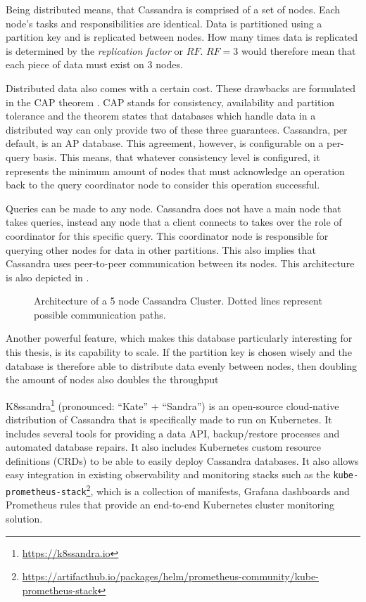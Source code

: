 Being distributed means, that Cassandra is comprised of a set of nodes. Each node's tasks and responsibilities are identical. Data is partitioned using a partition key and is replicated between nodes. How many times data is replicated is determined by the \textit{replication factor} or \(RF\). \(RF = 3\) would therefore mean that each piece of data must exist on 3 nodes.

Distributed data also comes with a certain cost. These drawbacks are formulated in the CAP theorem \cite{foxHarvestYieldScalable1999a}. CAP stands for consistency, availability and partition tolerance and the theorem states that databases which handle data in a distributed way can only provide two of these three guarantees. Cassandra, per default, is an AP database. This agreement, however, is configurable on a per-query basis. This means, that whatever consistency level is configured, it represents the minimum amount of nodes that must acknowledge an operation back to the query coordinator node to consider this operation successful.

Queries can be made to any node. Cassandra does not have a main node that takes queries, instead any node that a client connects to takes over the role of coordinator for this specific query. This coordinator node is responsible for querying other nodes for data in other partitions. This also implies that Cassandra uses peer-to-peer communication between its nodes. This architecture is also depicted in .

\begin{figure}
    \centering
    \caption{Architecture of a 5 node Cassandra Cluster. Dotted lines represent possible communication paths.}
    \label{fig:cassandra-architecture}
\end{figure}

Another powerful feature, which makes this database particularly interesting for this thesis, is its capability to scale. If the partition key is chosen wisely and the database is therefore able to distribute data evenly between nodes, then doubling the amount of nodes also doubles the throughput 

K8ssandra\footnote{\url{https://k8ssandra.io}} (pronounced: ``Kate'' +  ``Sandra'') is an open-source cloud-native distribution of Cassandra that is specifically made to run on Kubernetes. It includes several tools for providing a data API, backup/restore processes and automated database repairs. It also includes Kubernetes custom resource definitions (CRDs) to be able to easily deploy Cassandra databases. It also allows easy integration in existing observability and monitoring stacks such as the \texttt{kube-prometheus-stack}\footnote{\raggedright\url{https://artifacthub.io/packages/helm/prometheus-community/kube-prometheus-stack}}, which is a collection of manifests, Grafana dashboards and Prometheus rules that provide an end-to-end Kubernetes cluster monitoring solution.
